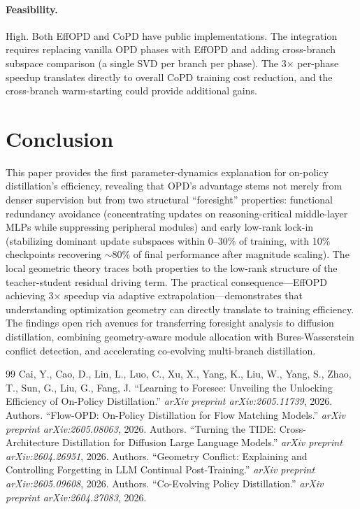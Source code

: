 \documentclass[11pt,a4paper]{article}
\begin{document}
\paragraph{Feasibility.} High. Both EffOPD and CoPD have public implementations. The integration requires replacing vanilla OPD phases with EffOPD and adding cross-branch subspace comparison (a single SVD per branch per phase). The 3$\times$ per-phase speedup translates directly to overall CoPD training cost reduction, and the cross-branch warm-starting could provide additional gains.

\section{Conclusion}

This paper provides the first parameter-dynamics explanation for on-policy distillation's efficiency, revealing that OPD's advantage stems not merely from denser supervision but from two structural ``foresight'' properties: functional redundancy avoidance (concentrating updates on reasoning-critical middle-layer MLPs while suppressing peripheral modules) and early low-rank lock-in (stabilizing dominant update subspaces within 0--30\% of training, with 10\% checkpoints recovering ${\sim}$80\% of final performance after magnitude scaling). The local geometric theory traces both properties to the low-rank structure of the teacher-student residual driving term. The practical consequence---EffOPD achieving 3$\times$ speedup via adaptive extrapolation---demonstrates that understanding optimization geometry can directly translate to training efficiency. The findings open rich avenues for transferring foresight analysis to diffusion distillation, combining geometry-aware module allocation with Bures-Wasserstein conflict detection, and accelerating co-evolving multi-branch distillation.

\begin{thebibliography}{99}
 Cai, Y., Cao, D., Lin, L., Luo, C., Xu, X., Yang, K., Liu, W., Yang, S., Zhao, T., Sun, G., Liu, G., Fang, J. ``Learning to Foresee: Unveiling the Unlocking Efficiency of On-Policy Distillation.'' \textit{arXiv preprint arXiv:2605.11739}, 2026.
 Authors. ``Flow-OPD: On-Policy Distillation for Flow Matching Models.'' \textit{arXiv preprint arXiv:2605.08063}, 2026.
 Authors. ``Turning the TIDE: Cross-Architecture Distillation for Diffusion Large Language Models.'' \textit{arXiv preprint arXiv:2604.26951}, 2026.
 Authors. ``Geometry Conflict: Explaining and Controlling Forgetting in LLM Continual Post-Training.'' \textit{arXiv preprint arXiv:2605.09608}, 2026.
 Authors. ``Co-Evolving Policy Distillation.'' \textit{arXiv preprint arXiv:2604.27083}, 2026.
\end{thebibliography}
\end{document}

